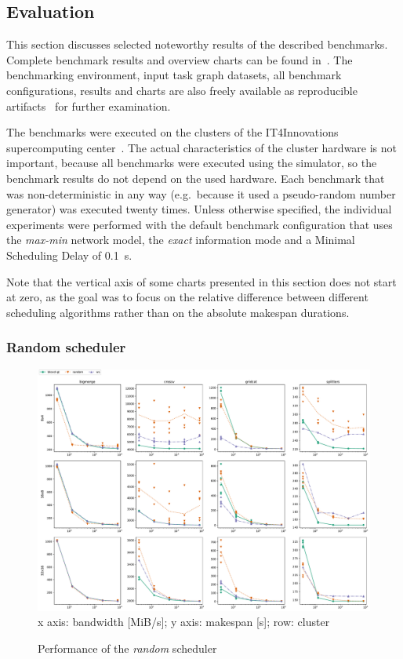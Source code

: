 
\subsection{Evaluation}
This section discusses selected noteworthy results of the described benchmarks. Complete benchmark
results and overview charts can be found in~\cite{estee}. The benchmarking environment,
input task graph datasets, all benchmark configurations, results and charts are also freely
available as reproducible artifacts~\cite{estee_results} for further examination.

The benchmarks were executed on the clusters of the IT4Innovations supercomputing
center~\cite{it4i}. The actual characteristics of the cluster hardware is not
important, because all benchmarks were executed using the \estee{} simulator, so the
benchmark results do not depend on the used hardware. Each benchmark that was non-deterministic in
any way (e.g.\ because it used a pseudo-random number generator) was executed twenty times. Unless
otherwise specified, the individual experiments were performed with the default benchmark
configuration that uses the \emph{max-min} network model, the \emph{exact}
information mode and a Minimal Scheduling Delay of \SI{0.1}{\second}.

Note that the vertical axis of some charts presented in this section does not start at zero, as the
goal was to focus on the relative difference between different scheduling algorithms rather than on
the absolute makespan durations.

\subsubsection*{Random scheduler}

\begin{figure}
	\centering
	\includegraphics[width=\textwidth]{imgs/estee/charts/random-scheduler}\\
	{\small x axis: bandwidth [MiB/s]; y axis: makespan [s]; row: cluster}
	\caption{Performance of the \emph{random} scheduler}
	\label{fig:estee-chart-random-scheduler}
\end{figure}

